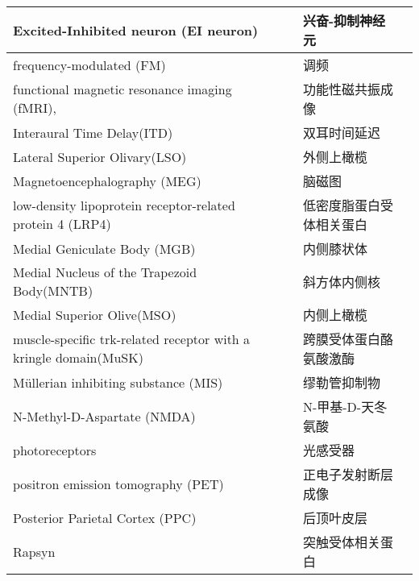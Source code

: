 \begin{table}[htbp]
{\begin{tabular}{llll}
		\midrule
		Excited-Inhibited neuron (EI neuron)     && 兴奋-抑制神经元   \\
		
		\midrule
		frequency-modulated (FM)     && 调频   \\
		
		\midrule
		functional magnetic resonance imaging (fMRI),     && 功能性磁共振成像   \\
		
		\midrule
		Interaural Time 		Delay(ITD)   && 双耳时间延迟  \\
		
		\midrule
		Lateral Superior Olivary(LSO)   && 外侧上橄榄  \\
		
			
		\midrule
		Magnetoencephalography (MEG)   && 脑磁图  \\
		
		\midrule
		low-density lipoprotein receptor-related protein 4 (LRP4)   && 低密度脂蛋白受体相关蛋白  \\
		
		\midrule
		Medial Geniculate Body (MGB)   && 内侧膝状体  \\
		
		\midrule
		Medial Nucleus of the Trapezoid Body(MNTB)   && 斜方体内侧核  \\
		
		\midrule
		Medial Superior 		Olive(MSO)   && 内侧上橄榄  \\
		
		\midrule
		muscle-specific trk-related receptor with a
		kringle domain(MuSK)   && 跨膜受体蛋白酪氨酸激酶  \\
		
		\midrule
		Müllerian inhibiting substance (MIS)   && 缪勒管抑制物  \\
		
		\midrule
		N-Methyl-D-Aspartate (NMDA)   && N-甲基-D-天冬氨酸  \\
		
		\midrule
		photoreceptors     && 光感受器   \\
		
		\midrule
		positron emission tomography (PET)     && 正电子发射断层成像   \\
		
		\midrule
		Posterior Parietal Cortex (PPC)     && 后顶叶皮层   \\
		
		\midrule
		Rapsyn   && 突触受体相关蛋白  \\
		

\end{tabular}}
\end{table}
